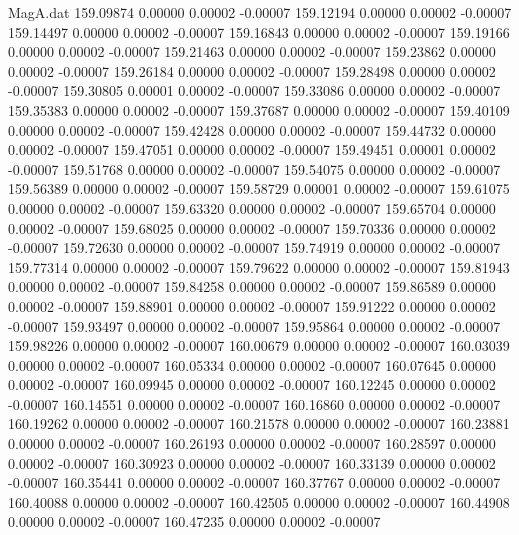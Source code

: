 \begin{filecontents}{MagA.dat}
 159.09874    0.00000    0.00002   -0.00007
 159.12194    0.00000    0.00002   -0.00007
 159.14497    0.00000    0.00002   -0.00007
 159.16843    0.00000    0.00002   -0.00007
 159.19166    0.00000    0.00002   -0.00007
 159.21463    0.00000    0.00002   -0.00007
 159.23862    0.00000    0.00002   -0.00007
 159.26184    0.00000    0.00002   -0.00007
 159.28498    0.00000    0.00002   -0.00007
 159.30805    0.00001    0.00002   -0.00007
 159.33086    0.00000    0.00002   -0.00007
 159.35383    0.00000    0.00002   -0.00007
 159.37687    0.00000    0.00002   -0.00007
 159.40109    0.00000    0.00002   -0.00007
 159.42428    0.00000    0.00002   -0.00007
 159.44732    0.00000    0.00002   -0.00007
 159.47051    0.00000    0.00002   -0.00007
 159.49451    0.00001    0.00002   -0.00007
 159.51768    0.00000    0.00002   -0.00007
 159.54075    0.00000    0.00002   -0.00007
 159.56389    0.00000    0.00002   -0.00007
 159.58729    0.00001    0.00002   -0.00007
 159.61075    0.00000    0.00002   -0.00007
 159.63320    0.00000    0.00002   -0.00007
 159.65704    0.00000    0.00002   -0.00007
 159.68025    0.00000    0.00002   -0.00007
 159.70336    0.00000    0.00002   -0.00007
 159.72630    0.00000    0.00002   -0.00007
 159.74919    0.00000    0.00002   -0.00007
 159.77314    0.00000    0.00002   -0.00007
 159.79622    0.00000    0.00002   -0.00007
 159.81943    0.00000    0.00002   -0.00007
 159.84258    0.00000    0.00002   -0.00007
 159.86589    0.00000    0.00002   -0.00007
 159.88901    0.00000    0.00002   -0.00007
 159.91222    0.00000    0.00002   -0.00007
 159.93497    0.00000    0.00002   -0.00007
 159.95864    0.00000    0.00002   -0.00007
 159.98226    0.00000    0.00002   -0.00007
 160.00679    0.00000    0.00002   -0.00007
 160.03039    0.00000    0.00002   -0.00007
 160.05334    0.00000    0.00002   -0.00007
 160.07645    0.00000    0.00002   -0.00007
 160.09945    0.00000    0.00002   -0.00007
 160.12245    0.00000    0.00002   -0.00007
 160.14551    0.00000    0.00002   -0.00007
 160.16860    0.00000    0.00002   -0.00007
 160.19262    0.00000    0.00002   -0.00007
 160.21578    0.00000    0.00002   -0.00007
 160.23881    0.00000    0.00002   -0.00007
 160.26193    0.00000    0.00002   -0.00007
 160.28597    0.00000    0.00002   -0.00007
 160.30923    0.00000    0.00002   -0.00007
 160.33139    0.00000    0.00002   -0.00007
 160.35441    0.00000    0.00002   -0.00007
 160.37767    0.00000    0.00002   -0.00007
 160.40088    0.00000    0.00002   -0.00007
 160.42505    0.00000    0.00002   -0.00007
 160.44908    0.00000    0.00002   -0.00007
 160.47235    0.00000    0.00002   -0.00007

\end{filecontents}
